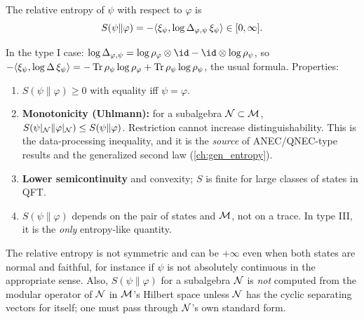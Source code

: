 \begin{definition}[Araki]
The relative entropy of $\psi$ with respect to $\varphi$ is
\begin{equation}
S(\psi\|\varphi)=-\langle \xi_\psi,\log\Delta_{\varphi,\psi}\,\xi_\psi\rangle\in[0,\infty].
\end{equation}
\end{definition}
In the type I case: $\log\Delta_{\varphi,\psi}=\log\rho_\varphi\otimes\id-\id\otimes\log\rho_\psi$, so $-\langle \xi_\psi,\log\Delta\,\xi_\psi\rangle=-\operatorname{Tr}\rho_\psi\log\rho_\varphi+\operatorname{Tr}\rho_\psi\log\rho_\psi$, the usual formula. Properties:
\begin{enumerate}
\item $S(\psi\|\varphi)\ge0$ with equality iff $\psi=\varphi$.
\item \textbf{Monotonicity (Uhlmann):} for a subalgebra $\mathcal{N}\subset\mathcal{M}$, $S(\psi|_{\mathcal{N}}\|\varphi|_{\mathcal{N}})\le S(\psi\|\varphi)$. Restriction cannot increase distinguishability. This is the data-processing inequality, and it is the \emph{source} of ANEC/QNEC-type results and the generalized second law (\cref{ch:gen_entropy}).
\item \textbf{Lower semicontinuity} and convexity; $S$ is finite for large classes of states in QFT.
\item $S(\psi\|\varphi)$ depends on the pair of states and $\mathcal{M}$, not on a trace. In type III, it is the \emph{only} entropy-like quantity.
\end{enumerate}

\begin{whatwrong}
The relative entropy is not symmetric and can be $+\infty$ even when both states are normal and faithful, for instance if $\psi$ is not absolutely continuous in the appropriate sense. Also, $S(\psi\|\varphi)$ for a subalgebra $\mathcal{N}$ is \emph{not} computed from the modular operator of $\mathcal{N}$ in $\mathcal{M}$'s Hilbert space unless $\mathcal{N}$ has the cyclic separating vectors for itself; one must pass through $\mathcal{N}$'s own standard form.
\end{whatwrong}

